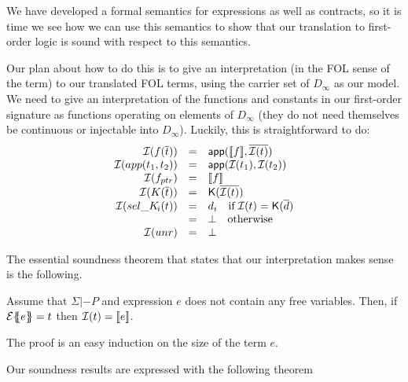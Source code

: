 We have developed a formal semantics for expressions as well as contracts, so it is time we
see how we can use this semantics to show that our translation to first-order logic is sound
with respect to this semantics.

Our plan about how to do this is to give an interpretation (in the FOL sense of the term) to our
translated FOL terms, using the carrier set of $D_\infty$ as our model.
We need to give an interpretation of the functions and constants in our
first-order signature as functions operating on elements of $D_\infty$ (they do not need themselves
be continuous or injectable into $D_\infty$). Luckily, this is straightforward to do:
\[\begin{array}{rcl}
   {\cal I}(f(\overline{t})) & = & \mathsf{app}([\![f]\!],\overline{{\cal I}(t)}) \\
   {\cal I}(app(t_1,t_2))     & = & \mathsf{app}({\cal I}(t_1), {\cal I}(t_2)) \\
   {\cal I}(f_{ptr})  & = & [\![f]\!] \\
   {\cal I}(K(\overline{t})) & = & \mathsf{K}(\overline{{\cal I}(t)}) \\
   {\cal I}(\mathop{sel\_K\!_{i}}(t)) & = &  d_i \quad \mbox{if}\; {\cal I}(t) = \mathsf{K}(\overline{d}) \\
                           & = & \bot \quad \mbox{otherwise} \\
  {\cal I}(unr)       & = & \bot
\end{array}\]

The essential soundness theorem that states that our interpretation makes sense is
the following.
\begin{theorem}\label{thm:interp-respect}
Assume that $\Sigma |- P$ and expression $e$ does not contain any free variables.
Then, if ${\cal E}\{\!\!\{e\}\!\!\} = t$ then ${\cal I}(t) = [\![e]\!]$.
\end{theorem}
The proof is an easy induction on the size of the term $e$.

Our soundness results are expressed with the following theorem


